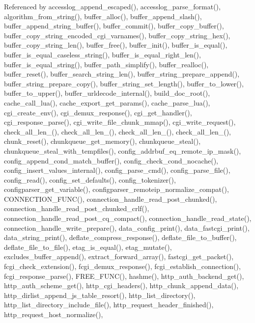 Referenced by accesslog\-\_\-append\-\_\-escaped(), accesslog\-\_\-parse\-\_\-format(), algorithm\-\_\-from\-\_\-string(), buffer\-\_\-alloc(), buffer\-\_\-append\-\_\-slash(), buffer\-\_\-append\-\_\-string\-\_\-buffer(), buffer\-\_\-commit(), buffer\-\_\-copy\-\_\-buffer(), buffer\-\_\-copy\-\_\-string\-\_\-encoded\-\_\-cgi\-\_\-varnames(), buffer\-\_\-copy\-\_\-string\-\_\-hex(), buffer\-\_\-copy\-\_\-string\-\_\-len(), buffer\-\_\-free(), buffer\-\_\-init(), buffer\-\_\-is\-\_\-equal(), buffer\-\_\-is\-\_\-equal\-\_\-caseless\-\_\-string(), buffer\-\_\-is\-\_\-equal\-\_\-right\-\_\-len(), buffer\-\_\-is\-\_\-equal\-\_\-string(), buffer\-\_\-path\-\_\-simplify(), buffer\-\_\-realloc(), buffer\-\_\-reset(), buffer\-\_\-search\-\_\-string\-\_\-len(), buffer\-\_\-string\-\_\-prepare\-\_\-append(), buffer\-\_\-string\-\_\-prepare\-\_\-copy(), buffer\-\_\-string\-\_\-set\-\_\-length(), buffer\-\_\-to\-\_\-lower(), buffer\-\_\-to\-\_\-upper(), buffer\-\_\-urldecode\-\_\-internal(), build\-\_\-doc\-\_\-root(), cache\-\_\-call\-\_\-lua(), cache\-\_\-export\-\_\-get\-\_\-params(), cache\-\_\-parse\-\_\-lua(), cgi\-\_\-create\-\_\-env(), cgi\-\_\-demux\-\_\-response(), cgi\-\_\-get\-\_\-handler(), cgi\-\_\-response\-\_\-parse(), cgi\-\_\-write\-\_\-file\-\_\-chunk\-\_\-mmap(), cgi\-\_\-write\-\_\-request(), check\-\_\-all\-\_\-len\-\_(), check\-\_\-all\-\_\-len\-\_(), check\-\_\-all\-\_\-len\-\_(), check\-\_\-all\-\_\-len\-\_(), chunk\-\_\-reset(), chunkqueue\-\_\-get\-\_\-memory(), chunkqueue\-\_\-steal(), chunkqueue\-\_\-steal\-\_\-with\-\_\-tempfiles(), config\-\_\-addrbuf\-\_\-eq\-\_\-remote\-\_\-ip\-\_\-mask(), config\-\_\-append\-\_\-cond\-\_\-match\-\_\-buffer(), config\-\_\-check\-\_\-cond\-\_\-nocache(), config\-\_\-insert\-\_\-values\-\_\-internal(), config\-\_\-parse\-\_\-cmd(), config\-\_\-parse\-\_\-file(), config\-\_\-read(), config\-\_\-set\-\_\-defaults(), config\-\_\-tokenizer(), configparser\-\_\-get\-\_\-variable(), configparser\-\_\-remoteip\-\_\-normalize\-\_\-compat(), C\-O\-N\-N\-E\-C\-T\-I\-O\-N\-\_\-\-F\-U\-N\-C(), connection\-\_\-handle\-\_\-read\-\_\-post\-\_\-chunked(), connection\-\_\-handle\-\_\-read\-\_\-post\-\_\-chunked\-\_\-crlf(), connection\-\_\-handle\-\_\-read\-\_\-post\-\_\-cq\-\_\-compact(), connection\-\_\-handle\-\_\-read\-\_\-state(), connection\-\_\-handle\-\_\-write\-\_\-prepare(), data\-\_\-config\-\_\-print(), data\-\_\-fastcgi\-\_\-print(), data\-\_\-string\-\_\-print(), deflate\-\_\-compress\-\_\-response(), deflate\-\_\-file\-\_\-to\-\_\-buffer(), deflate\-\_\-file\-\_\-to\-\_\-file(), etag\-\_\-is\-\_\-equal(), etag\-\_\-mutate(), excludes\-\_\-buffer\-\_\-append(), extract\-\_\-forward\-\_\-array(), fastcgi\-\_\-get\-\_\-packet(), fcgi\-\_\-check\-\_\-extension(), fcgi\-\_\-demux\-\_\-response(), fcgi\-\_\-establish\-\_\-connection(), fcgi\-\_\-response\-\_\-parse(), F\-R\-E\-E\-\_\-\-F\-U\-N\-C(), hashme(), http\-\_\-auth\-\_\-backend\-\_\-get(), http\-\_\-auth\-\_\-scheme\-\_\-get(), http\-\_\-cgi\-\_\-headers(), http\-\_\-chunk\-\_\-append\-\_\-data(), http\-\_\-dirlist\-\_\-append\-\_\-js\-\_\-table\-\_\-resort(), http\-\_\-list\-\_\-directory(), http\-\_\-list\-\_\-directory\-\_\-include\-\_\-file(), http\-\_\-request\-\_\-header\-\_\-finished(), http\-\_\-request\-\_\-host\-\_\-normalize(), 